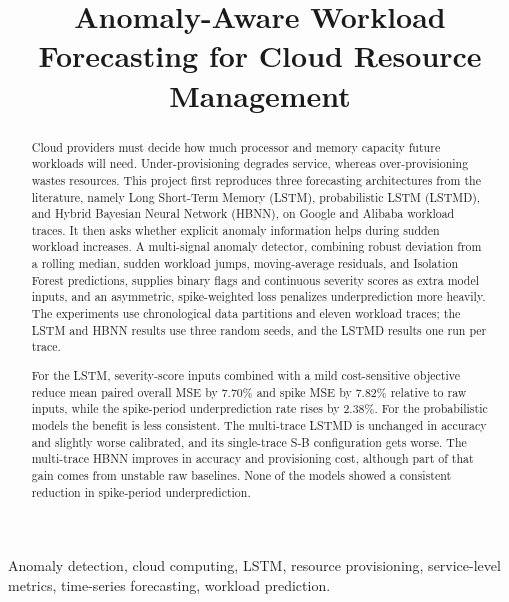 \documentclass[conference]{IEEEtran}
\begin{document}
\title{Anomaly-Aware Workload Forecasting for Cloud Resource Management}

\author{
}

\maketitle

\begin{abstract}
Cloud providers must decide how much processor and memory capacity future workloads will need. Under-provisioning degrades service, whereas over-provisioning wastes resources. This project first reproduces three forecasting architectures from the literature, namely Long Short-Term Memory (LSTM), probabilistic LSTM (LSTMD), and Hybrid Bayesian Neural Network (HBNN), on Google and Alibaba workload traces. It then asks whether explicit anomaly information helps during sudden workload increases. A multi-signal anomaly detector, combining robust deviation from a rolling median, sudden workload jumps, moving-average residuals, and Isolation Forest predictions, supplies binary flags and continuous severity scores as extra model inputs, and an asymmetric, spike-weighted loss penalizes underprediction more heavily. The experiments use chronological data partitions and eleven workload traces; the LSTM and HBNN results use three random seeds, and the LSTMD results one run per trace.

For the LSTM, severity-score inputs combined with a mild cost-sensitive objective reduce mean paired overall MSE by 7.70\% and spike MSE by 7.82\% relative to raw inputs, while the spike-period underprediction rate rises by 2.38\%. For the probabilistic models the benefit is less consistent. The multi-trace LSTMD is unchanged in accuracy and slightly worse calibrated, and its single-trace S-B configuration gets worse. The multi-trace HBNN improves in accuracy and provisioning cost, although part of that gain comes from unstable raw baselines. None of the models showed a consistent reduction in spike-period underprediction.
\end{abstract}

\begin{IEEEkeywords}
Anomaly detection, cloud computing, LSTM, resource provisioning, service-level metrics, time-series forecasting, workload prediction.
\end{IEEEkeywords}
\end{document}
